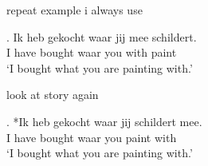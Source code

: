 \documentclass[xcolor=dvipsnames,10pt]{beamer}
\begin{document}
\begin{frame}

	repeat example i always use

\exg. Ik heb gekocht waar jij mee schildert.\\
 I have bought waar you with paint\\
 `I bought what you are painting with.'\label{ex:meestranded}

	look at story again

\exg. *Ik heb gekocht waar jij schildert mee.\\
 I have bought waar you paint with\\
 `I bought what you are painting with.'\label{ex:meeend}

\end{frame}
\end{document}

